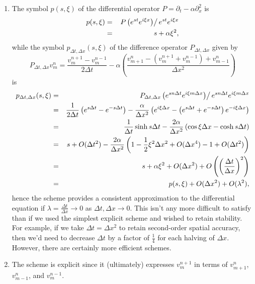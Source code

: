 \documentclass{article}
\begin{document}
\begin{enumerate}
\begin{enumerate}
\item The symbol \(p(s,\xi)\) of the differential operator \(P = \partial_t - \alpha \partial_x^2\) is
\begin{eqnarray*}
p(s,\xi)
& = & \left. P \left( e^{st} e^{i\xi x} \right) \right/ e^{st} e^{i\xi x} \\
& = & s + \alpha \xi^2,
\end{eqnarray*}
while the symbol \(p_{\Delta t, \Delta x}(s,\xi)\) of the difference operator \(P_{\Delta t, \Delta x}\) given by
\[P_{\Delta t, \Delta x} v^n_m
  = \frac{v^{n+1}_m - v^{n-1}_m}{2 \Delta t} - \alpha \left( \frac{v^n_{m+1} - (v^{n+1}_m + v^{n-1}_m) + v^n_{m-1}}{\Delta x^2} \right)\]
is
\begin{eqnarray*}
p_{\Delta t, \Delta x}(s,\xi)
& = & \left. P_{\Delta t, \Delta x} \left( e^{sn\Delta t} e^{i\xi m\Delta x} \right) \right/ e^{sn\Delta t} e^{i\xi m\Delta x} \\
& = & \frac{1}{2\Delta t} \left( e^{s\Delta t} - e^{-s\Delta t} \right)
    - \frac{\alpha}{\Delta x^2} \left( e^{i\xi\Delta x} - \left( e^{s\Delta t} + e^{-s\Delta t} \right) e^{-i\xi\Delta x} \right) \\
& = & \frac{1}{\Delta t} \sinh s\Delta t - \frac{2\alpha}{\Delta x^2} \left( \cos \xi\Delta x - \cosh s\Delta t \right) \\
& = & s + O(\Delta t^2) - \frac{2\alpha}{\Delta x^2} \left( 1 - \frac{1}{2} \xi^2 \Delta x^2 + O(\Delta x^4) - 1 + O(\Delta t^2) \right) \\
& = & s + \alpha \xi^2 + O(\Delta x^2) + O \left( \left( \frac{\Delta t}{\Delta x} \right)^2 \right) \\
& = & p(s,\xi) + O(\Delta x^2) + O(\lambda^2),
\end{eqnarray*}
hence the scheme provides a consistent approximation to the differential equation if \(\lambda = \frac{\Delta t}{\Delta x} \to 0\) as \(\Delta t, \Delta x \to 0\).  This isn't any more difficult to satisfy than if we used the simplest explicit scheme and wished to retain stability.  For example, if we take \(\Delta t = \Delta x^2\) to retain second-order spatial accuracy, then we'd need to decrease \(\Delta t\) by a factor of \(\frac{1}{4}\) for each halving of \(\Delta x\).  However, there are certainly more efficient schemes.

\item The scheme is explicit since it (ultimately) expresses \(v^{n+1}_m\) in terms of \(v^n_{m+1}\), \(v^n_{m-1}\), and \(v^{n-1}_m\).


\end{enumerate}
\end{enumerate}
\end{document}
